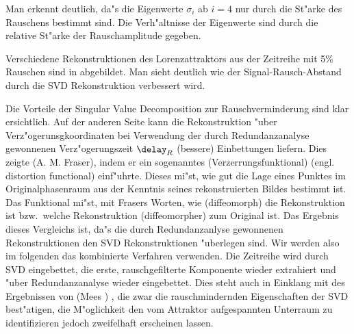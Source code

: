 Man erkennt deutlich, da"s die Eigenwerte $\sigma_i$ ab $i=4$ nur durch die St"arke des
Rauschens bestimmt sind. 
Die Verh"altnisse der Eigenwerte sind durch die relative St"arke der
Rauschamplitude gegeben. 

Verschiedene Rekonstruktionen des Lorenzattraktors aus der Zeitreihe mit 5\% Rauschen sind 
in  abgebildet. Man sieht deutlich wie der Signal-Rausch-Abstand durch
die SVD Rekonstruktion verbessert wird. 


Die Vorteile der Singular Value Decomposition zur Rauschverminderung sind klar
ersichtlich. Auf der anderen Seite kann die Rekonstruktion "uber Verz"ogerunsgkoordinaten
bei Verwendung der durch Redundanzanalyse gewonnenen Verz"ogerungszeit $\delay_R$
\naja(bessere) Einbettungen liefern. Dies zeigte \autor(A. M. Fraser), indem er ein
sogenanntes \begriff(Verzerrungsfunktional) (engl. distortion functional)
einf"uhrte. Dieses mi"st, wie gut die Lage eines Punktes im Originalphasenraum aus der
Kenntnis seines rekonstruierten Bildes bestimmt ist\cite{fraser}. Das Funktional mi"st,
mit Frasers Worten, wie \naja(diffeomorph) die Rekonstruktion ist bzw.\  welche
Rekonstruktion \naja(diffeomorpher) zum Original ist. Das Ergebnis dieses Vergleichs ist,
da"s die durch Redundanzanlyse gewonnenen Rekonstruktionen den SVD Rekonstruktionen
"uberlegen sind. Wir werden also im folgenden das kombinierte Verfahren verwenden. Die
Zeitreihe wird durch SVD eingebettet, die erste, rauschgefilterte Komponente wieder
extrahiert und "uber Redundanzanalyse wieder eingebettet. Dies steht auch in Einklang mit
des Ergebnissen von \autor(Mees \etal) , die zwar die rauschmindernden
Eigenschaften der SVD best"atigen, die M"oglichkeit den vom Attraktor aufgespannten
Unterraum zu identifizieren jedoch zweifelhaft erscheinen lassen\cite{Mees87}.












